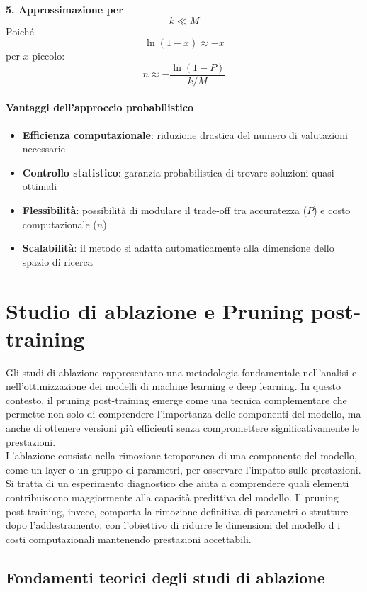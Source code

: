\documentclass[a4paper,12pt]{report}
\begin{document}
	\textbf{5. Approssimazione per}
	$$k \ll M$$
	Poiché
	$$ \ln(1 - x) \approx -x $$
	per \(x\) piccolo: \\
	$$
	n \approx - \frac{\ln(1 - P)}{k/M}
	$$
	
	\subsubsection{Vantaggi dell'approccio probabilistico}
	\begin{itemize}
		\item \textbf{Efficienza computazionale}: riduzione drastica del numero di valutazioni necessarie
		\item \textbf{Controllo statistico}: garanzia probabilistica di trovare soluzioni quasi-ottimali
		\item \textbf{Flessibilità}: possibilità di modulare il trade-off tra accuratezza ($P$) e costo computazionale ($n$)
		\item \textbf{Scalabilità}: il metodo si adatta automaticamente alla dimensione dello spazio di ricerca
	\end{itemize}
	
	\chapter{Studio di ablazione e Pruning post-training}
	
	Gli studi di ablazione rappresentano una metodologia fondamentale nell'analisi e nell'ottimizzazione dei modelli di machine learning e deep learning. In questo contesto, il pruning post-training emerge come una tecnica complementare che permette non solo di comprendere l'importanza delle componenti del modello, ma anche di ottenere versioni più efficienti senza compromettere significativamente le prestazioni. \\
	L'ablazione consiste nella rimozione temporanea di una componente del modello, come un layer o un gruppo di parametri, per osservare l'impatto sulle prestazioni. Si tratta di un esperimento diagnostico che aiuta a comprendere quali elementi contribuiscono maggiormente alla capacità predittiva del modello. Il pruning post-training, invece, comporta la rimozione definitiva di parametri o strutture dopo l'addestramento, con l'obiettivo di ridurre le dimensioni del modello d i costi computazionali mantenendo prestazioni accettabili.
	
	\section{Fondamenti teorici degli studi di ablazione}
	
\end{document}
